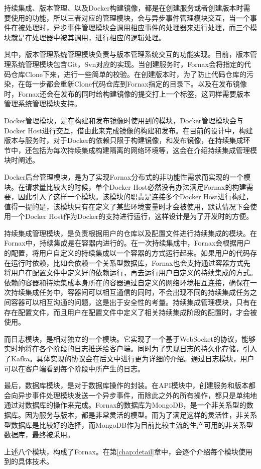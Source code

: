 持续集成、版本管理、以及Docker构建镜像，都是在创建服务或者创建版本时需要使用的功能，所以三者对应的管理模块，会与异步事件管理模块交互，当一个事件在被处理时，异步事件管理模块会调用相应事件的处理器来进行处理，而三个模块就是在处理器中被其调用，进行相应的逻辑处理。

其中，版本管理系统管理模块负责与版本管理系统交互的功能实现。目前，版本管理系统管理模块包含Git，Svn对应的实现。当创建服务时，Fornax会将指定的代码仓库Clone下来，进行一些简单的校验。在创建版本时，为了防止代码仓库的污染，在每一步都会重新Clone代码仓库到Fornax指定的目录下。以及在发布镜像时，Fornax还会在发布的同时给构建镜像的提交打上一个标签，这同样需要版本管理系统管理模块支持。

Docker管理模块，是在构建和发布镜像时使用到的模块，Docker管理模块会与Docker Host进行交互，借由此来完成镜像的构建和发布。在目前的设计中，构建版本与服务时，对于Docker的依赖只限于构建镜像，和发布镜像，在持续集成环节中，还包括为每次持续集成构建隔离的网络环境等，这会在介绍持续集成管理模块时阐述。

Docker后台管理模块，是为了实现Fornax分布式的非功能性需求而实现的一个模块。在请求量比较大的时候，单个Docker Host必然没有办法满足Fornax的构建需要，因此引入了这样一个模块。该模块的职责是连接多个Docker Host进行构建，值得一提的是，该模块只有在定义了某些环境变量时才会被使用，默认情况下会使用一个Docker Host作为Docker的支持进行运行，这样设计是为了开发时的方便。

持续集成管理模块，是负责根据用户的仓库以及配置文件进行持续集成的模块。在Fornax中，持续集成是在容器内进行的。在一次持续集成中，Fornax会根据用户的配置，将用户自定义的持续集成以一个容器的方式运行起来。如果用户的代码存在运行时依赖，比如会依赖一个关系型数据库，Fornax也会支持通过容器方式先将用户在配置文件中定义好的依赖运行，再去运行用户自定义的持续集成的方式。依赖的容器和持续集成本身所在的容器通过自定义的网络环境相互连接，确保在一次持续集成任务中，容器间可以相互通信的同时，不会出现不同的持续集成任务之间容器可以相互沟通的问题，这是出于安全性的考量。持续集成管理模块，只有在存在配置文件，而且用户在配置文件中定义了相关持续集成阶段的配置时，才会被使用。

而日志模块，是相对独立的一个模块。它实现了一个基于WebSocket的协议，能够实时地将在各个阶段的日志推送给客户端。同时为了实现日志的持久化存储，引入了Kafka。具体实现的协议会在后文中进行更为详细的介绍。通过日志模块，用户可以在客户端看到每个阶段中所产生的日志。

最后，数据库模块，是对于数据库操作的封装。在API模块中，创建服务和版本都会向异步事件处理模块发送一个异步事件，而除此之外的所有操作，都只是单纯地通过对数据库的操作来完成。Fornax的数据库为MongoDB，是一个非关系型的数据库。因为服务与版本，都是非常灵活的模型。而为了满足这样的灵活性，非关系型数据库是比较好的选择，而MongoDB作为目前比较主流的生产可用的非关系型数据库，最终被采用。

上述八个模块，构成了Fornax。在第\ref{chap:detail}章中，会逐个介绍每个模块使用到的具体技术。